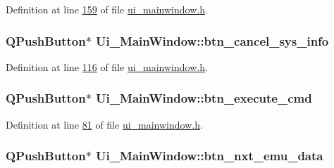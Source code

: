 Definition at line \hyperlink{a00139_source_l00159}{159} of file \hyperlink{a00139_source}{ui\+\_\+mainwindow.\+h}.

\hypertarget{a00080_a72415fe77c8f6eb7b13d16177a14b39a}{
\subsubsection[{btn\+\_\+cancel\+\_\+sys\+\_\+info}]{\setlength{\rightskip}{0pt plus 5cm}Q\+Push\+Button$\ast$ Ui\+\_\+\+Main\+Window\+::btn\+\_\+cancel\+\_\+sys\+\_\+info}}\label{a00080_a72415fe77c8f6eb7b13d16177a14b39a}


Definition at line \hyperlink{a00139_source_l00116}{116} of file \hyperlink{a00139_source}{ui\+\_\+mainwindow.\+h}.

\hypertarget{a00080_a9ea50d44e38316e4203933698cbc14a6}{
\subsubsection[{btn\+\_\+execute\+\_\+cmd}]{\setlength{\rightskip}{0pt plus 5cm}Q\+Push\+Button$\ast$ Ui\+\_\+\+Main\+Window\+::btn\+\_\+execute\+\_\+cmd}}\label{a00080_a9ea50d44e38316e4203933698cbc14a6}


Definition at line \hyperlink{a00139_source_l00081}{81} of file \hyperlink{a00139_source}{ui\+\_\+mainwindow.\+h}.

\hypertarget{a00080_a11126ea7922009f1354c9bfefb93f5e9}{
\subsubsection[{btn\+\_\+nxt\+\_\+emu\+\_\+data}]{\setlength{\rightskip}{0pt plus 5cm}Q\+Push\+Button$\ast$ Ui\+\_\+\+Main\+Window\+::btn\+\_\+nxt\+\_\+emu\+\_\+data}}\label{a00080_a11126ea7922009f1354c9bfefb93f5e9}


